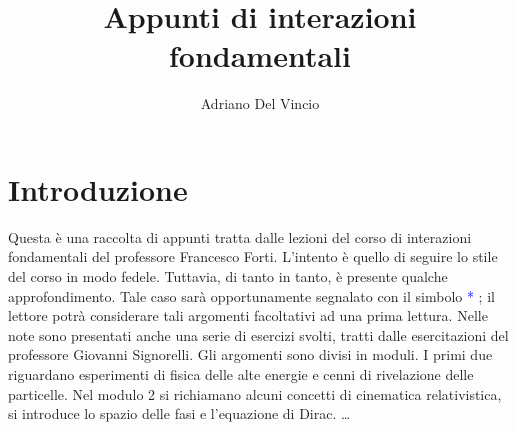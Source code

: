 \documentclass[12pt,a4paper,twoside]{book}
\title{Appunti di interazioni fondamentali}
\author{Adriano Del Vincio}
\begin{document}
\maketitle

\section{Introduzione}
Questa è una raccolta di appunti tratta dalle lezioni del corso di interazioni fondamentali del professore Francesco Forti. 
L'intento è quello di seguire lo stile del corso in modo fedele. Tuttavia, di tanto in tanto, è presente qualche approfondimento. Tale caso sarà opportunamente segnalato con il simbolo \textcolor{blue}{*} ; il lettore potrà considerare tali argomenti facoltativi ad una prima lettura.
Nelle note sono presentati anche una serie di esercizi svolti, tratti dalle esercitazioni del professore Giovanni Signorelli. 
Gli argomenti sono divisi in moduli. I primi due riguardano esperimenti di fisica delle alte energie e cenni di rivelazione delle particelle. Nel modulo 2 si richiamano alcuni concetti di cinematica relativistica, si introduce lo spazio delle fasi e l'equazione di Dirac. \dots

\frontmatter
\tableofcontents 






\end{document}
